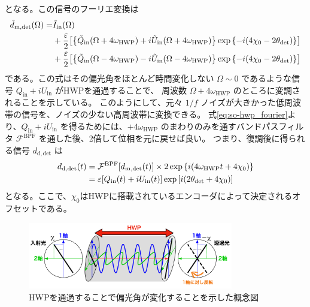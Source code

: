 \documentclass[../../main.tex]{subfiles}
\begin{document}
となる。この信号のフーリエ変換は
\begin{equation}
    \label{eq:so-hwp_fourier}
    \begin{split}
        \tilde{d}_{\mathrm{m}, \mathrm{det}}(\Omega) = &\tilde{I}_{\mathrm{in}}(\Omega) \\
            &+ \dfrac{\varepsilon}{2}\qty[\qty{\tilde{Q}_{\mathrm{in}}(\Omega+4\omega_{\mathrm{HWP}})+i\tilde{U}_{\mathrm{in}}(\Omega+4\omega_{\mathrm{HWP}})}\exp\qty{-i\qty(4\chi_0 - 2\theta_{\mathrm{det}})}] \\
            &+ \dfrac{\varepsilon}{2}\qty[\qty{\tilde{Q}_{\mathrm{in}}(\Omega-4\omega_{\mathrm{HWP}})-i\tilde{U}_{\mathrm{in}}(\Omega-4\omega_{\mathrm{HWP}})}\exp\qty{-i\qty(4\chi_0 - 2\theta_{\mathrm{det}})}]
    \end{split}
\end{equation}
である。この式はその偏光角をほとんど時間変化しない $\Omega\sim0$ であるような信号 $Q_{\mathrm{in}}+iU_{\mathrm{in}}$ がHWPを通過することで、
周波数 $\Omega + 4\omega_{\mathrm{HWP}}$ のところに変調されることを示している。
このようにして、元々 $1/f$ ノイズが大きかった低周波帯の信号を、ノイズの少ない高周波帯に変換できる。
式\eqref{eq:so-hwp_fourier}より、$Q_{\mathrm{in}}+iU_{\mathrm{in}}$ を得るためには、$+4\omega_{\mathrm{HWP}}$ のまわりのみを通すバンドパスフィルタ $\mathcal{F}^{\mathrm{BPF}}$ を通した後、2倍して位相を元に戻せば良い。
つまり、復調後に得られる信号 $d_{\mathrm{d, det}}$ は
\begin{align}
    d_{\mathrm{d, det}}(t) &= \mathcal{F}^{\mathrm{BPF}}\qty[d_{\mathrm{m,det}}(t)]\times 2\exp\qty{i\qty(4\omega_{\mathrm{HWP}}t + 4\chi_0)} \\
    &= \varepsilon\qty[Q_{\mathrm{in}}(t) + iU_{\mathrm{in}}(t)]\exp\qty[i\qty(2\theta_{\mathrm{det}}+4\chi_0)]
    \label{eq:so-hwp_demod}
\end{align}
となる。ここで、$\chi_0$はHWPに搭載されているエンコーダによって決定されるオフセットである。

\begin{figure}[H]
    \centering
    \includegraphics[width=0.8\textwidth]{simons_observatory/hwp_satoru.pdf}
    \caption{HWPを通過することで偏光角が変化することを示した概念図~\cite{takakura_PhD}}
    \label{fig:so-hwp_satoru}
\end{figure}
\end{document}
